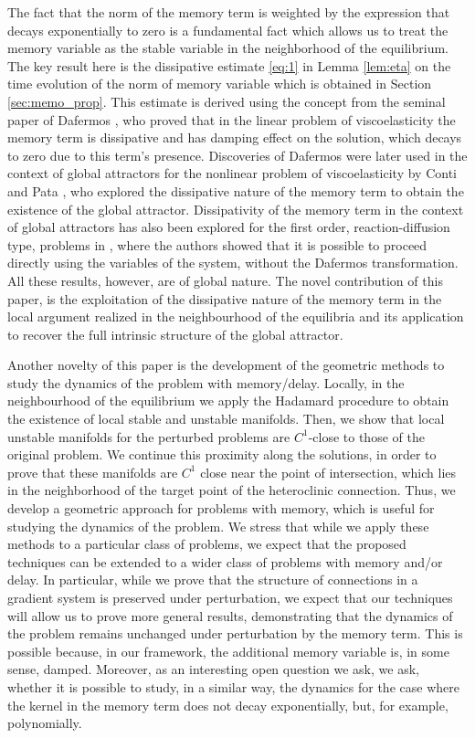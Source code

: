 \documentclass[11pt, leqno]{amsart}
\theoremstyle{definition}
\begin{document}
The fact that the norm of the memory term is weighted by the expression that decays exponentially to zero is a fundamental fact which allows us to treat the memory variable as the stable variable in the neighborhood of the equilibrium. The key result here is the dissipative estimate \eqref{eq:1} in Lemma \ref{lem:eta} on the time evolution of the norm of memory variable which is obtained in Section \ref{sec:memo_prop}. This estimate is derived using the concept from the seminal paper of Dafermos \cite{Dafermos}, who proved that in the linear problem of viscoelasticity the memory term is dissipative and has damping effect on the solution, which decays to zero due to this term's presence. Discoveries of Dafermos were later used in the context of global attractors for the nonlinear problem of viscoelasticity by Conti and Pata \cite{Pata}, who explored the dissipative nature of the memory term to obtain the existence of the global attractor. Dissipativity of the memory term in the context of global attractors has also been explored for the first order, reaction-diffusion type, problems in \cite{PataSquassina, Cara1, Cara2}, where the authors showed that it is possible to proceed directly using the variables of the system, without the Dafermos transformation. All these results, however, are of global nature. The novel contribution of this paper, is the exploitation of the dissipative nature of the memory term in the local argument realized in the neighbourhood of the equilibria and its application to recover the full intrinsic structure of the global attractor.

Another novelty of this paper is the development of the geometric methods to study the dynamics of the problem with memory/delay. Locally, in the neighbourhood of the equilibrium we apply the Hadamard procedure to obtain the existence of local stable and unstable manifolds. Then, we  show that local unstable manifolds for the perturbed problems are $C^1$-close to those of the original problem. We continue this proximity along the solutions, in order to prove that these manifolds are $C^1$ close  near the point of intersection, which lies in the neighborhood of the target point of the heteroclinic connection. Thus, we develop a geometric approach for problems with memory, which is useful for studying the dynamics of the problem. We stress that while we apply these methods to a particular class of problems, we expect that the proposed techniques can be extended to a wider class of problems with memory and/or delay. In particular, while we prove that the structure of connections in a gradient system is preserved under perturbation, we expect that our techniques will allow us to prove more general results, demonstrating that the dynamics of the problem remains unchanged under perturbation by the memory term. This is possible because, in our framework, the additional memory variable is, in some sense, damped. Moreover, as an interesting open question we ask, we ask, whether it is possible to study, in a similar way, the dynamics for the case where  the kernel in the memory term does not decay exponentially, but, for example, polynomially.
\end{document}
